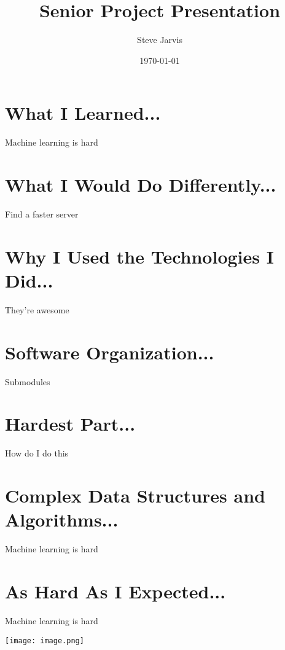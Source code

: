 \documentclass{article}
\title{Senior Project Presentation}
\author{Steve Jarvis}
\date{\today}
\begin{document}
\maketitle

\section{What I Learned...}
    Machine learning is hard

\section{What I Would Do Differently...}
    Find a faster server

\section{Why I Used the Technologies I Did...}
    They're awesome

\section{Software Organization...}
    Submodules

\section{Hardest Part...}
    How do I do this

\section{Complex Data Structures and Algorithms...}
    Machine learning is hard

\section{As Hard As I Expected...}
    Machine learning is hard


\begin{center}
\texttt{[image: image.png]}
\end{center}
\end{document}

